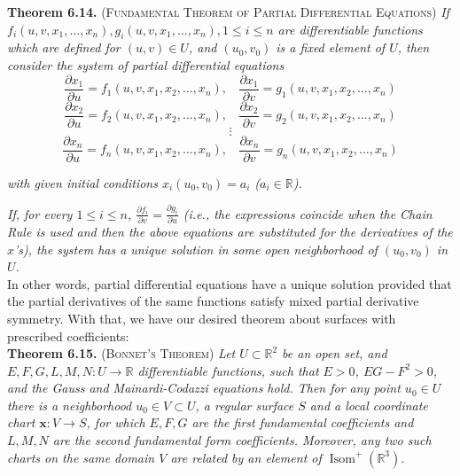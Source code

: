 \documentclass[leqno]{book}
\begin{document}
\noindent\textbf{Theorem 6.14.} \textsc{(Fundamental Theorem of Partial Differential Equations)} \emph{If $f_i(u,v,x_1,\dots,x_n),g_i(u,v,x_1,\dots,x_n),1\leqslant i\leqslant n$ are differentiable functions which are defined for $(u,v)\in U$, and $(u_0,v_0)$ is a fixed element of $U$, then consider the system of partial differential equations}
$$\frac{\partial x_1}{\partial u}=f_1(u,v,x_1,x_2,\dots,x_n),~~~~\frac{\partial x_1}{\partial v}=g_1(u,v,x_1,x_2,\dots,x_n)$$
$$\frac{\partial x_2}{\partial u}=f_2(u,v,x_1,x_2,\dots,x_n),~~~~\frac{\partial x_2}{\partial v}=g_2(u,v,x_1,x_2,\dots,x_n)$$
$$\vdots$$
$$\frac{\partial x_n}{\partial u}=f_n(u,v,x_1,x_2,\dots,x_n),~~~~\frac{\partial x_n}{\partial v}=g_n(u,v,x_1,x_2,\dots,x_n)$$
\begin{center}
\emph{with given initial conditions $x_i(u_0,v_0)=a_i$ ($a_i\in\mathbb R$).}
\end{center}
\emph{If, for every $1\leqslant i\leqslant n$, $\frac{\partial f_i}{\partial v}=\frac{\partial g_i}{\partial u}$ (i.e., the expressions coincide when the Chain Rule is used and then the above equations are substituted for the derivatives of the $x$'s), the system has a unique solution in some open neighborhood of $(u_0,v_0)$ in $U$.}\\

\noindent In other words, partial differential equations have a unique solution provided that the partial derivatives of the same functions satisfy mixed partial derivative symmetry.  With that, we have our desired theorem about surfaces with prescribed coefficients:\\

\noindent\textbf{Theorem 6.15.} \textsc{(Bonnet's Theorem)} \emph{Let $U\subset\mathbb R^2$ be an open set, and $E,F,G,L,M,N:U\to\mathbb R$ differentiable functions, such that $E>0$, $EG-F^2>0$, and the Gauss and Mainardi-Codazzi equations hold.  Then for any point $u_0\in U$ there is a neighborhood $u_0\in V\subset U$, a regular surface $S$ and a local coordinate chart $\mathbf x:V\to S$, for which $E,F,G$ are the first fundamental coefficients and $L,M,N$ are the second fundamental form coefficients.  Moreover, any two such charts on the same domain $V$ are related by an element of $\operatorname{Isom}^+(\mathbb R^3)$.}\\
\end{document}
